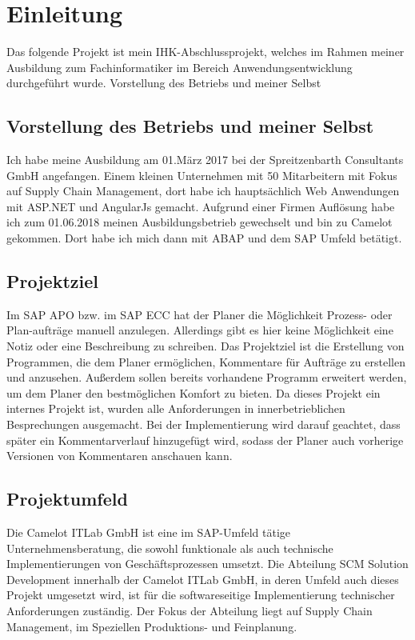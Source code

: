 \section{Einleitung}
\label{sec:Einleitung}
	Das folgende Projekt ist mein IHK-Abschlussprojekt, welches im Rahmen meiner Ausbildung zum Fachinformatiker im Bereich Anwendungsentwicklung durchgeführt wurde.
	Vorstellung des Betriebs und meiner Selbst



\subsection{Vorstellung des Betriebs und meiner Selbst} 
\label{sec:Vorstellung des Betriebs und meiner Selbst}
	Ich habe meine Ausbildung am 01.März 2017 bei der Spreitzenbarth Consultants GmbH angefangen. Einem kleinen Unternehmen mit 50 Mitarbeitern mit Fokus auf Supply Chain Management, dort habe ich hauptsächlich Web Anwendungen mit ASP.NET und AngularJs gemacht. Aufgrund einer Firmen Auflösung habe ich zum 01.06.2018 meinen Ausbildungsbetrieb gewechselt und bin zu Camelot gekommen. Dort habe ich mich dann mit ABAP und dem SAP Umfeld betätigt.


\subsection{Projektziel} 
\label{sec:Projektziel}
	Im SAP APO bzw. im SAP ECC hat der Planer die Möglichkeit Prozess- oder Plan-aufträge manuell anzulegen. Allerdings gibt es hier keine Möglichkeit eine Notiz oder eine Beschreibung zu schreiben. Das Projektziel ist die Erstellung von Programmen, die dem Planer ermöglichen, Kommentare	für Aufträge zu erstellen und anzusehen. Außerdem sollen bereits vorhandene Programm erweitert werden, um dem Planer den bestmöglichen Komfort zu bieten. Da dieses Projekt ein internes Projekt ist, wurden alle Anforderungen in innerbetrieblichen Besprechungen ausgemacht.  Bei der Implementierung wird darauf geachtet, dass später ein Kommentarverlauf hinzugefügt wird, sodass der Planer auch vorherige Versionen von Kommentaren anschauen kann. 


\subsection{Projektumfeld}
\label{sec:Projektumfeld}
	Die Camelot ITLab GmbH ist eine im SAP-Umfeld tätige Unternehmensberatung, die sowohl	funktionale als auch technische Implementierungen von Geschäftsprozessen umsetzt.	Die Abteilung SCM Solution Development innerhalb der Camelot ITLab GmbH, in deren Umfeld	auch dieses Projekt umgesetzt wird, ist für die softwareseitige Implementierung technischer	Anforderungen zuständig. Der Fokus der Abteilung liegt auf Supply Chain Management, im Speziellen Produktions- und Feinplanung.
	

